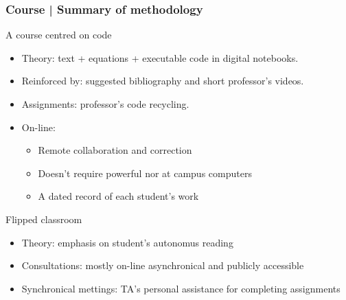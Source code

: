 \documentclass[aspectratio=169]{beamer}
\begin{document}
\begin{frame}
	\frametitle{Course | Summary of methodology}
	\begin{block}{A course centred on code}
		\begin{itemize}[<+->]
			\item Theory: text + equations + executable code in digital notebooks.
			\item Reinforced by: suggested bibliography and short professor's videos.
			\item Assignments: professor's code recycling.
			\item On-line:
			\begin{itemize}[<+->]
				\item Remote collaboration and correction
				\item Doesn't require powerful nor at campus computers
				\item A dated record of each student's work
			\end{itemize}
		\end{itemize}
	\end{block}
	\begin{block}{Flipped classroom}
		\begin{itemize}[<+->]
			\item Theory: emphasis on student's autonomus reading
			\item Consultations: mostly on-line asynchronical and publicly accessible
			\item Synchronical mettings: TA's personal assistance for completing assignments
		\end{itemize}
	\end{block}
\end{frame}
\end{document}
